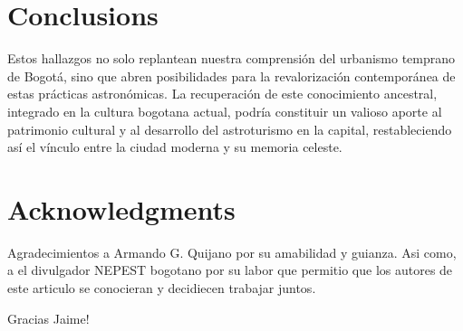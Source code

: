 \documentclass[a4paper,alpha-refs]{eSpectra}
\begin{document}
\section{Conclusions}
Estos hallazgos no solo replantean nuestra comprensión del urbanismo temprano de Bogotá, sino que abren posibilidades para la revalorización contemporánea de estas prácticas astronómicas. La recuperación de este conocimiento ancestral, integrado en la cultura bogotana actual, podría constituir un valioso aporte al patrimonio cultural y al desarrollo del astroturismo en la capital, restableciendo así el vínculo entre la ciudad moderna y su memoria celeste.



\section*{Acknowledgments}
Agradecimientos a Armando G. Quijano por su amabilidad y guianza. Asi como, a el divulgador NEPEST bogotano por su labor que permitio que los autores de este articulo se conocieran y decidiecen trabajar juntos.

\smallskip
Gracias Jaime!



\end{document}

